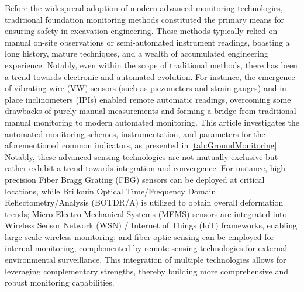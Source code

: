 \documentclass[preprint,11pt,authoryear,3p]{elsarticle}
\begin{document}
Before the widespread adoption of modern advanced monitoring technologies, traditional foundation monitoring methods constituted the primary means for ensuring safety in excavation engineering. These methods typically relied on manual on-site observations or semi-automated instrument readings, boasting a long history, mature techniques, and a wealth of accumulated engineering experience.\citep{LI20081519} Notably, even within the scope of traditional methods, there has been a trend towards electronic and automated evolution.\citep{CHENG2002375} For instance, the emergence of vibrating wire (VW) sensors (such as piezometers and strain gauges) and in-place inclinometers (IPIs) enabled remote automatic readings, overcoming some drawbacks of purely manual measurements and forming a bridge from traditional manual monitoring to modern automated monitoring.\citep{SIEBENMANN2015207} This article investigates the automated monitoring schemes, instrumentation, and parameters for the aforementioned common indicators, as presented in \autoref{tab:GroundMonitoring}. Notably, these advanced sensing technologies are not mutually exclusive but rather exhibit a trend towards integration and convergence. For instance, high-precision Fiber Bragg Grating (FBG) sensors can be deployed at critical locations, while Brillouin Optical Time/Frequency Domain Reflectometry/Analysis (BOTDR/A) is utilized to obtain overall deformation trends; Micro-Electro-Mechanical Systems (MEMS) sensors are integrated into Wireless Sensor Network (WSN) / Internet of Things (IoT) frameworks, enabling large-scale wireless monitoring; and fiber optic sensing can be employed for internal monitoring, complemented by remote sensing technologies for external environmental surveillance. This integration of multiple technologies allows for leveraging complementary strengths, thereby building more comprehensive and robust monitoring capabilities.
\end{document}

